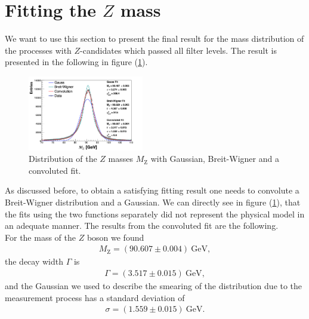 \documentclass[twocolumn,
			   showpacs,%
               nofootinbib,
               aps,%
               prd,
               notitlepage,
               showkeys,
               10pt]{revtex4-1}
\begin{document}
\section{Fitting the $Z$ mass}

We want to use this section to present the final result for the mass distribution of the processes with $Z$-candidates which passed all filter levels. The result is presented in the following in figure (\ref{fig:MassDist}).

\begin{figure}[H]
	\centering
	\includegraphics[width = 0.45\textwidth]{figures/plots/ZMass_corr}
	\caption{Distribution of the $Z$ masses $M_{\mathrm{Z}}$ with Gaussian, Breit-Wigner and a convoluted fit.}
	\label{fig:MassDist}
\end{figure}

As discussed before, to obtain a satisfying fitting result one needs to convolute a Breit-Wigner distribution and a Gaussian. We can directly see in figure (\ref{fig:MassDist}), that the fits using the two functions separately did not represent the physical model in an adequate manner.
The results from the convoluted fit are the following. \\

For the mass of the $Z$ boson we found
\begin{align}
	M_{\mathrm{Z}} = (90.607 \pm 0.004) \ \text{GeV},
\end{align} 
the decay width $\Gamma$ is
\begin{align}
\Gamma = (3.517 \pm 0.015) \ \text{GeV},	
\end{align}
and the Gaussian we used to describe the smearing of the distribution due to the measurement process has a standard deviation of 
\begin{align}
	\sigma = (1.559 \pm 0.015) \ \text{GeV}.
\end{align}
\end{document}
